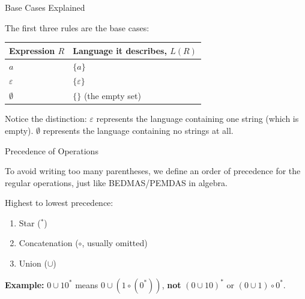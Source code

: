 \documentclass[10pt,aspectratio=169]{beamer}
\newcommand{\eps}{\varepsilon}
\begin{document}
\begin{frame}{Base Cases Explained}

The first three rules are the base cases:

\vspace{1em}

\begin{table}[]
\begin{tabular}{ll}
\toprule
\textbf{Expression $R$} & \textbf{Language it describes, $L(R)$} \\
\midrule
$a$ & $\{a\}$ \\
$\eps$ & $\{\eps\}$ \\
$\emptyset$ & $\{\}$ (the empty set) \\
\bottomrule
\end{tabular}
\end{table}

\vspace{1em}
Notice the distinction: $\eps$ represents the language containing one string (which is empty). $\emptyset$ represents the language containing no strings at all.

\end{frame}

\begin{frame}{Precedence of Operations}

To avoid writing too many parentheses, we define an order of precedence for the regular operations, just like BEDMAS/PEMDAS in algebra.

\vspace{1em}

Highest to lowest precedence:
\begin{enumerate}
    \item Star ($^*$)
    \item Concatenation ($\circ$, usually omitted)
    \item Union ($\cup$)
\end{enumerate}

\vspace{1em}
\textbf{Example:}
$0 \cup 10^*$ means $0 \cup (1 \circ (0^*))$, \textbf{not} $(0 \cup 10)^*$ or $(0 \cup 1) \circ 0^*$.

\end{frame}
\end{document}
